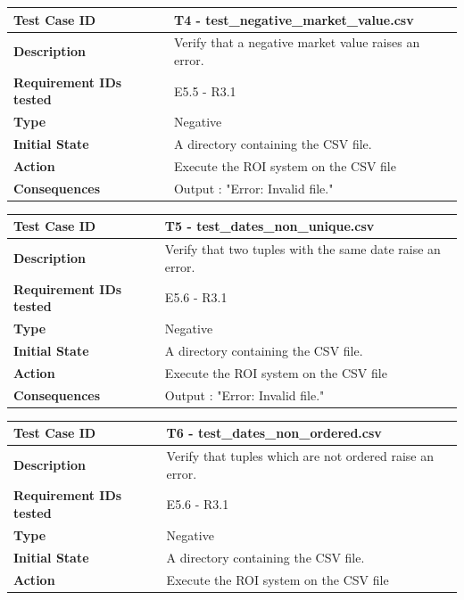 \documentclass[runningheads,12pt]{article}
\begin{document}
{\begin{tabular}{|p{1.2in}|p{4in}|}
\hline
\end{tabular}
\bigskip
\centering
\begin{tabular}{|p{1.2in}|p{4in}|}
\hline
\textbf{Test Case ID} & T4 - test\_negative\_market\_value.csv \\ 
\hline
\textbf{Description} & Verify that a negative market value raises an error.\\
\hline
\textbf{Requirement IDs tested} & E5.5 - R3.1 \\ 
\hline
\textbf{Type} & Negative \\ 
\hline
\textbf{Initial State} & A directory containing the CSV file.\\
\hline 
\textbf{Action} & Execute the ROI system on the CSV file \\
\hline 
\textbf{Consequences} & Output : "Error: Invalid file." \\ 
\hline
\end{tabular}
\bigskip
\centering
\begin{tabular}{|p{1.2in}|p{4in}|}
\hline
\textbf{Test Case ID} & T5 - test\_dates\_non\_unique.csv \\ 
\hline
\textbf{Description} & Verify that two tuples with the same date raise an error.\\
\hline
\textbf{Requirement IDs tested} & E5.6 - R3.1 \\ 
\hline
\textbf{Type} & Negative \\ 
\hline
\textbf{Initial State} & A directory containing the CSV file.\\
\hline 
\textbf{Action} & Execute the ROI system on the CSV file \\
\hline 
\textbf{Consequences} & Output : "Error: Invalid file." \\ 
\hline
\end{tabular}
\bigskip
\centering
\begin{tabular}{|p{1.2in}|p{4in}|}
\hline
\textbf{Test Case ID} & T6 - test\_dates\_non\_ordered.csv \\ 
\hline
\textbf{Description} & Verify that tuples which are not ordered raise an error.\\
\hline
\textbf{Requirement IDs tested} & E5.6 - R3.1 \\ 
\hline
\textbf{Type} & Negative \\ 
\hline
\textbf{Initial State} & A directory containing the CSV file.\\
\hline 
\textbf{Action} & Execute the ROI system on the CSV file \\
\hline 

\end{tabular}}
\end{document}
